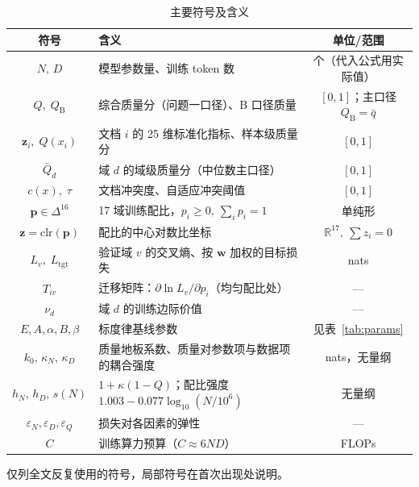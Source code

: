 \documentclass[11pt]{article}
\begin{document}
\begin{table}[H]
\centering\small
\caption{主要符号及含义}
\begin{tabular}{clc}
\toprule
符号 & 含义 & 单位/范围 \\
\midrule
$N,\,D$ & 模型参数量、训练 token 数 & 个（代入公式用实际值） \\
$Q,\;Q_{\mathrm B}$ & 综合质量分（问题一口径）、B 口径质量 & $[0,1]$；主口径 $Q_{\mathrm B}=\bar q$ \\
$\bm z_i,\;Q(x_i)$ & 文档 $i$ 的 25 维标准化指标、样本级质量分 & $[0,1]$ \\
$\bar Q_d$ & 域 $d$ 的域级质量分（中位数主口径） & $[0,1]$ \\
$c(x),\;\tau$ & 文档冲突度、自适应冲突阈值 & $[0,1]$ \\
$\bm p\in\Delta^{16}$ & 17 域训练配比，$p_i\ge0,\ \sum_ip_i=1$ & 单纯形 \\
$\bm z=\mathrm{clr}(\bm p)$ & 配比的中心对数比坐标 & $\mathbb R^{17},\ \sum z_i=0$ \\
$L_v,\;L_{\mathrm{tgt}}$ & 验证域 $v$ 的交叉熵、按 $\bm w$ 加权的目标损失 & nats \\
$T_{iv}$ & 迁移矩阵：$\partial\ln L_v/\partial p_i$（均匀配比处） & --- \\
$\nu_d$ & 域 $d$ 的训练边际价值 & --- \\
$E,A,\alpha,B,\beta$ & 标度律基线参数 & 见表~\ref{tab:params} \\
$k_0,\,\kappa_N,\,\kappa_D$ & 质量地板系数、质量对参数项与数据项的耦合强度 & nats，无量纲 \\
$h_N,\,h_D,\,s(N)$ & $1+\kappa(1-Q)$；配比强度 $1.003-0.077\log_{10}(N/10^6)$ & 无量纲 \\
$\varepsilon_N,\varepsilon_D,\varepsilon_Q$ & 损失对各因素的弹性 & --- \\
$C$ & 训练算力预算（$C\approx6ND$） & FLOPs \\
\bottomrule
\end{tabular}
\end{table}

仅列全文反复使用的符号，局部符号在首次出现处说明。



\end{document}
